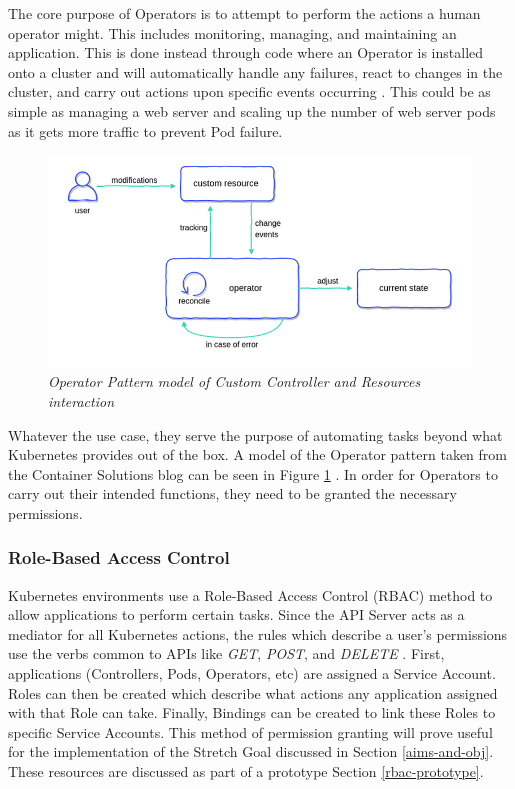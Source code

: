 \documentclass{article}
\begin{document}
The core purpose of Operators is to attempt to perform the actions a human operator might. This includes monitoring, managing, and maintaining an application. This is done instead through code where an Operator is installed onto a cluster and will automatically handle any failures, react to changes in the cluster, and carry out actions upon specific events occurring \cite{operator-pattern}. This could be as simple as managing a web server and scaling up the number of web server pods as it gets more traffic to prevent Pod failure.
\begin{figure}[H]
    \centering
    \includegraphics[width=160mm]{tech/operator-pattern.png}
    \caption{\emph{Operator Pattern model of Custom Controller and Resources interaction}}
    \label{op-pat}
\end{figure}

Whatever the use case, they serve the purpose of automating tasks beyond what Kubernetes provides out of the box. A model of the Operator pattern taken from the Container Solutions blog can be seen in Figure \ref{op-pat} \cite{op-pat-blog}. In order for Operators to carry out their intended functions, they need to be granted the necessary permissions.



\subsubsection{Role-Based Access Control}

Kubernetes environments use a Role-Based Access Control (RBAC) method to allow applications to perform certain tasks. Since the API Server acts as a mediator for all Kubernetes actions, the rules which describe a user's permissions use the verbs common to APIs like \emph{GET}, \emph{POST}, and \emph{DELETE} \cite{rbac}. First, applications (Controllers, Pods, Operators, etc) are assigned a Service Account. Roles can then be created which describe what actions any application assigned with that Role can take. Finally, Bindings can be created to link these Roles to specific Service Accounts. This method of permission granting will prove useful for the implementation of the Stretch Goal discussed in Section \ref{aims-and-obj}. These resources are discussed as part of a prototype Section \ref{rbac-prototype}.
\end{document}
